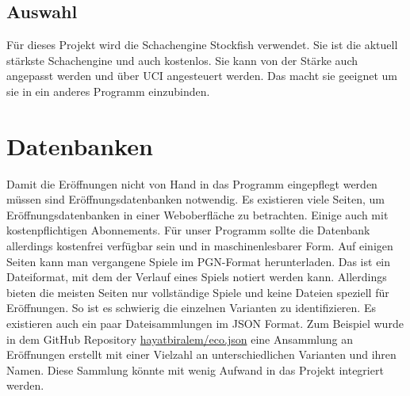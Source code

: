 \subsection{Auswahl}
Für dieses Projekt wird die Schachengine Stockfish verwendet. Sie ist die aktuell stärkste Schachengine und auch kostenlos. Sie kann von der Stärke auch angepasst werden und über \ac{UCI} angesteuert werden. Das macht sie geeignet um sie in ein anderes Programm einzubinden.

\section{Datenbanken}
Damit die Eröffnungen nicht von Hand in das Programm eingepflegt werden müssen sind Eröffnungsdatenbanken notwendig. Es existieren viele Seiten, um Eröffnungsdatenbanken in einer Weboberfläche zu betrachten. Einige auch mit kostenpflichtigen Abonnements. Für unser Programm sollte die Datenbank allerdings kostenfrei verfügbar sein und in maschinenlesbarer Form. Auf einigen Seiten kann man vergangene Spiele im \ac{PGN}-Format herunterladen. Das ist ein Dateiformat, mit dem der Verlauf eines Spiels notiert werden kann. Allerdings bieten die meisten Seiten nur vollständige Spiele und keine Dateien speziell für Eröffnungen. So ist es schwierig die einzelnen Varianten zu identifizieren. Es existieren auch ein paar Dateisammlungen im JSON Format. Zum Beispiel wurde in dem GitHub Repository \href{https://github.com/hayatbiralem/eco.json}{hayatbiralem/eco.json} eine Ansammlung an Eröffnungen erstellt mit einer Vielzahl an unterschiedlichen Varianten und ihren Namen. Diese Sammlung könnte mit wenig Aufwand in das Projekt integriert werden.
